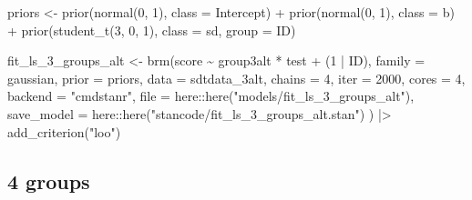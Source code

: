 \documentclass[
  man,floatsintext]{apa7}
\newenvironment{Shaded}{\begin{snugshade}}{\end{snugshade}}
\newcommand{\AttributeTok}[1]{\textcolor[rgb]{0.77,0.63,0.00}{#1}}
\newcommand{\DecValTok}[1]{\textcolor[rgb]{0.00,0.00,0.81}{#1}}
\newcommand{\FunctionTok}[1]{\textcolor[rgb]{0.00,0.00,0.00}{#1}}
\newcommand{\NormalTok}[1]{#1}
\newcommand{\OtherTok}[1]{\textcolor[rgb]{0.56,0.35,0.01}{#1}}
\newcommand{\SpecialCharTok}[1]{\textcolor[rgb]{0.00,0.00,0.00}{#1}}
\newcommand{\StringTok}[1]{\textcolor[rgb]{0.31,0.60,0.02}{#1}}
\begin{document}
\begin{Shaded}
\begin{Highlighting}[]
\NormalTok{priors }\OtherTok{\textless{}{-}} \FunctionTok{prior}\NormalTok{(}\FunctionTok{normal}\NormalTok{(}\DecValTok{0}\NormalTok{, }\DecValTok{1}\NormalTok{), }\AttributeTok{class =}\NormalTok{ Intercept) }\SpecialCharTok{+}
  \FunctionTok{prior}\NormalTok{(}\FunctionTok{normal}\NormalTok{(}\DecValTok{0}\NormalTok{, }\DecValTok{1}\NormalTok{), }\AttributeTok{class =}\NormalTok{ b) }\SpecialCharTok{+}
  \FunctionTok{prior}\NormalTok{(}\FunctionTok{student\_t}\NormalTok{(}\DecValTok{3}\NormalTok{, }\DecValTok{0}\NormalTok{, }\DecValTok{1}\NormalTok{), }\AttributeTok{class =}\NormalTok{ sd, }\AttributeTok{group =}\NormalTok{ ID) }

\NormalTok{fit\_ls\_3\_groups\_alt }\OtherTok{\textless{}{-}} \FunctionTok{brm}\NormalTok{(score }\SpecialCharTok{\textasciitilde{}}\NormalTok{ group3alt }\SpecialCharTok{*}\NormalTok{ test }\SpecialCharTok{+}\NormalTok{ (}\DecValTok{1} \SpecialCharTok{|}\NormalTok{ ID),}
                      \AttributeTok{family =}\NormalTok{ gaussian,}
                      \AttributeTok{prior =}\NormalTok{ priors,}
                      \AttributeTok{data =}\NormalTok{ sdtdata\_3alt,}
                      \AttributeTok{chains =} \DecValTok{4}\NormalTok{, }\AttributeTok{iter =} \DecValTok{2000}\NormalTok{, }\AttributeTok{cores =} \DecValTok{4}\NormalTok{,}
                      \AttributeTok{backend =} \StringTok{"cmdstanr"}\NormalTok{,}
                      \AttributeTok{file =}\NormalTok{ here}\SpecialCharTok{::}\FunctionTok{here}\NormalTok{(}\StringTok{"models/fit\_ls\_3\_groups\_alt"}\NormalTok{),}
                      \AttributeTok{save\_model =}\NormalTok{ here}\SpecialCharTok{::}\FunctionTok{here}\NormalTok{(}\StringTok{"stancode/fit\_ls\_3\_groups\_alt.stan"}\NormalTok{)}
\NormalTok{                      ) }\SpecialCharTok{|\textgreater{}}
  \FunctionTok{add\_criterion}\NormalTok{(}\StringTok{"loo"}\NormalTok{)}
\end{Highlighting}
\end{Shaded}

\hypertarget{groups-2}{%
\subsection{4 groups}\label{groups-2}}
\end{document}
